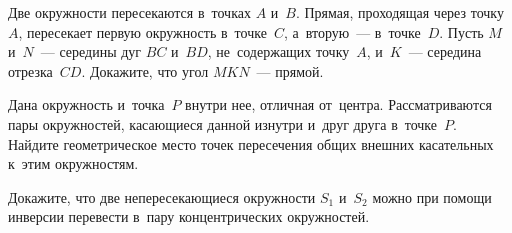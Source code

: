 \begin{problems}
\item
Две окружности пересекаются в~точках $A$ и~$B$.
Прямая, проходящая через точку~$A$, пересекает первую окружность в~точке~$C$,
а~вторую~--- в~точке~$D$.
Пусть $M$ и~$N$~--- середины дуг $BC$ и~$BD$, не~содержащих точку~$A$,
и~$K$~--- середина отрезка~$CD$.
Докажите, что угол $MKN$~--- прямой.

\item
Дана окружность и~точка~$P$ внутри нее, отличная от~центра.
Рассматриваются пары окружностей, касающиеся данной изнутри и~друг друга
в~точке~$P$.
Найдите геометрическое место точек пересечения общих внешних касательных к~этим
окружностям.

\item
Докажите, что две непересекающиеся окружности $S_1$ и~$S_2$ можно при помощи
инверсии перевести в~пару концентрических окружностей.

\end{problems}

